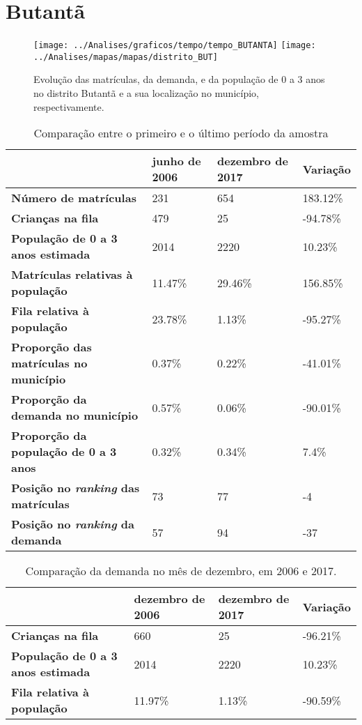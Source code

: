\section{Butantã}
\begin{figure}[H]
\centering
\texttt{[image: ../Analises/graficos/tempo/tempo\_BUTANTA]}
\texttt{[image: ../Analises/mapas/mapas/distrito\_BUT]}
\caption{Evolução das matrículas, da demanda, e da população de 0 a 3 anos no distrito Butantã e a sua localização no município, respectivamente.}
\end{figure}
\begin{table}[H]
\begin{tabular}{l|l|l|l}
\textbf{}                                      & \textbf{junho de 2006}       & \textbf{dezembro de 2017}    & \textbf{Variação} \\ \hline
\textbf{Número de matrículas}                  & 231 & 654 & 183.12\% \\ \hline
\textbf{Crianças na fila}                      & 479 & 25 & -94.78\% \\ \hline
\textbf{População de 0 a 3 anos estimada}      & 2014 & 2220 & 10.23\% \\ \hline
\textbf{Matrículas relativas à população}      & 11.47\% & 29.46\% & 156.85\% \\ \hline
\textbf{Fila relativa à população}             & 23.78\% & 1.13\% & -95.27\% \\ \hline
\textbf{Proporção das matrículas no município} & 0.37\% & 0.22\% & -41.01\% \\ \hline
\textbf{Proporção da demanda no município}     & 0.57\% & 0.06\% & -90.01\% \\ \hline
\textbf{Proporção da população de 0 a 3 anos}  & 0.32\% & 0.34\% & 7.4\% \\ \hline
\textbf{Posição no \textit{ranking} das matrículas}     & 73 & 77 & -4 \\ \hline
\textbf{Posição no \textit{ranking} da demanda}         & 57 & 94 & -37 \\ 
\end{tabular}
\caption{Comparação entre o primeiro e o último período da amostra}
\end{table}
\begin{table}[H]
\begin{tabular}{l|l|l|l}
\textbf{}                                 & \textbf{dezembro de 2006} & \textbf{dezembro de 2017} & \textbf{Variação} \\ \hline
\textbf{Crianças na fila}                      & 660 & 25 & -96.21\% \\ \hline
\textbf{População de 0 a 3 anos estimada}      & 2014 & 2220 & 10.23\% \\ \hline
\textbf{Fila relativa à população}             & 11.97\% & 1.13\% & -90.59\% \\
\end{tabular}
\caption{Comparação da demanda no mês de dezembro, em 2006 e 2017.}
\end{table}
